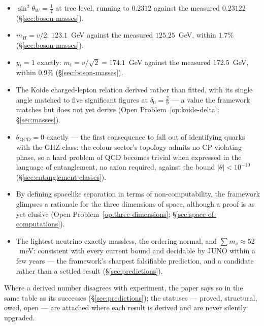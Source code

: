 \begin{itemize}
\item $\sin^{2}\theta_{W} = \tfrac14$ at tree level, running to $0.2312$ against the measured
      $0.23122$ (\S\ref{sec:boson-masses}).
\item $m_{H} = v/2$: $123.1$~GeV against the measured $125.25$~GeV, within $1.7\%$
      (\S\ref{sec:boson-masses}).
\item $y_{t} = 1$ exactly: $m_{t} = v/\sqrt{2} = 174.1$~GeV against the measured $172.5$~GeV,
      within $0.9\%$ (\S\ref{sec:boson-masses}).
\item The Koide charged-lepton relation derived rather than fitted, with its single angle
      matched to five significant figures at $\delta_{0} = \tfrac29$ --- a value the framework
      matches but does not yet derive (Open Problem~\ref{op:koide-delta};
      \S\ref{sec:masses}).
\item $\theta_{\mathrm{QCD}} = 0$ exactly --- the first consequence to fall out of identifying
      quarks with the GHZ class: the colour sector's topology admits no CP-violating phase, so a
      hard problem of QCD becomes trivial when expressed in the language of entanglement, no axion
      required, against the bound $\lvert\theta\rvert < 10^{-10}$
      (\S\ref{sec:entanglement-classes}).
\item By defining spacelike separation in terms of non-computability, the framework glimpses a
      rationale for the three dimensions of space, although a proof is as yet elusive
      (Open Problem~\ref{op:three-dimensions}; \S\ref{sec:space-of-computations}).
\item The lightest neutrino exactly massless, the ordering normal, and
      $\sum m_{\nu} \approx 52$~meV: consistent with every current bound and decidable by JUNO
      within a few years --- the framework's sharpest falsifiable prediction, and a candidate
      rather than a settled result (\S\ref{sec:predictions}).
\end{itemize}

Where a derived number disagrees with experiment, the paper says so in the same table as its
successes (\S\ref{sec:predictions}); the statuses --- proved, structural, owed, open --- are
attached where each result is derived and are never silently upgraded.
